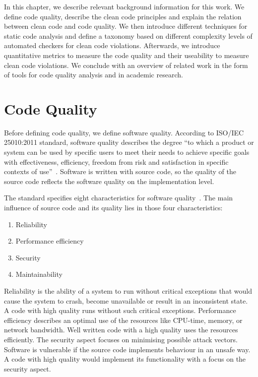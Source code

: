 In this chapter, we describe relevant background information for this work. We define code quality, describe the clean code principles and explain the relation between clean code and code quality. We then introduce different techniques for static code analysis and define a taxonomy based on different complexity levels of automated checkers for clean code violations. Afterwards, we introduce quantitative metrics to measure the code quality and their useability to measure clean code violations. We conclude with an overview of related work in the form of tools for code quality analysis and in academic research.

\section{Code Quality}\label{sec:code_quality}
Before defining code quality, we define software quality. According to ISO/IEC 25010:2011 standard, software quality describes the degree \enquote{to which a product or system can be used by specific users to meet their needs to achieve specific goals with effectiveness, efficiency, freedom from risk and satisfaction in specific contexts of use}~\cite{iso_central_secretary_isoiec_2011-1}. Software is written with source code, so the quality of the source code reflects the software quality on the implementation level. 

The standard specifies eight characteristics for software quality~\cite{iso_central_secretary_isoiec_2011-1}. The main influence of source code and its quality lies in those four characteristics:
\begin{enumerate}
    \item Reliability
    \item Performance efficiency
    \item Security
    \item Maintainability
\end{enumerate}
Reliability is the ability of a system to run without critical exceptions that would cause the system to crash, become unavailable or result in an inconsistent state. A code with high quality runs without such critical exceptions. Performance efficiency describes an optimal use of the resources like CPU-time, memory, or network bandwidth. Well written code with a high quality uses the resources efficiently. The security aspect focuses on minimising possible attack vectors. Software is vulnerable if the source code implements behaviour in an unsafe way. A code with high quality would implement its functionality with a focus on the security aspect. 

